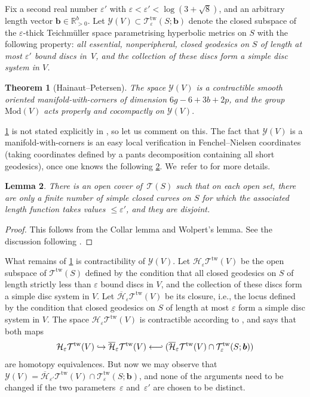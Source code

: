 \documentclass[11pt]{article}
\newcommand{\ie}{i.e.,\xspace}
\newcommand\hto{\mathrel{\lhook\joinrel\to}}
\newcommand\from{\mathchoice{\longleftarrow}{\leftarrow}{\leftarrow}{\leftarrow}}
\newcommand\hfrom{\mathrel{\from\joinrel\rhook}}
\newcommand{\bb}{\boldsymbol{b}}
\theoremstyle{plain}
\newtheorem{thm}{Theorem}[section]
\newtheorem{lem}[thm]{Lemma}
\theoremstyle{definition}
\let\eps\varepsilon
\newcommand{\T}{\mathcal T}
\newcommand{\TT}{\mathcal T^{\mathrm{tw}}}
\newcommand{\Y}{\mathcal Y}
\newcommand{\hmod}{\mathrm{Mod}}
\begin{document}
Fix a second real number $\eps'$ with $\eps<\eps'<\log(3+\sqrt 8)$, and an arbitrary length vector $\bb \in \mathbb R^b_{>0}$. Let $\Y(V) \subset \TT_\eps(S;\bb)$ denote the closed subspace of the $\eps$-thick Teichmüller space parametrising hyperbolic metrics on $S$ with the following property:
\emph{all essential, nonperipheral, closed geodesics on $S$ of length at most $\eps'$ bound discs in~$V$, and the collection of these discs form a simple disc system in $V$.}

\begin{thm}[Hainaut--Petersen]\label{hp}
The space $\Y(V)$ is a contractible smooth oriented manifold-with-corners of dimension $6g-6+3b+2p$, and the group $\hmod(V)$ acts properly and cocompactly on $\Y(V).$
\end{thm}

\cref{hp} is not stated explicitly in \cite{hainautpetersen}, so let us comment on this. The fact that $\Y(V)$ is a manifold-with-corners is an easy local verification in Fenchel--Nielsen coordinates (taking coordinates defined by a pants decomposition containing all short geodesics), once one knows the following \cref{lemma:wolpert}. We~refer to \cite[\S 2]{hainautpetersen} for more details.

\begin{lem}\label{lemma:wolpert}
There is an open cover of $\,\T(S)$ such that on each open set, there are only a finite number of simple closed curves on $S$ for which the associated length function takes values $\leq \eps'$, and they are disjoint.
\end{lem}

\begin{proof}This follows from the Collar lemma and Wolpert's lemma. See the discussion following \cite[Th.\,2.3]{hainautpetersen}.
\end{proof}
What remains of \cref{hp} is contractibility of $\Y(V)$. Let $\mathcal{H}_\eps\TT(V)$ be the open subspace of $\TT(S)$ defined by the condition that all closed geodesics on $S$ of length strictly less than $\eps$ bound discs in $V$, and the collection of these discs form a simple disc system in $V$. Let $\overline{\mathcal{H}}_\eps\TT(V)$ be its closure, \ie the locus defined by the condition that closed geodesics on $S$ of length at most $\eps$ form a simple disc system in $V$. The space $\mathcal{H}_\eps\TT(V)$ is contractible according to \cite[Th.\,1.4]{hainautpetersen}, and \cite[Prop.\,3.5]{hainautpetersen} says that both maps\vspace*{-3pt}\enlargethispage{.5\baselineskip}
\[
\mathcal{H}_\eps\TT(V) \hto \overline{\mathcal{H}}_\eps\TT(V) \hfrom (\overline{\mathcal{H}}_\eps\TT(V) \cap \TT_\eps(S;\bb))
\]
are homotopy equivalences. But now we may observe that $\Y(V) = \overline{\mathcal{H}}_{\eps'}\TT(V) \cap \TT_\eps(S;\bb)$, and none of the arguments need to be changed if the two parameters~$\eps$ and~$\eps'$ are chosen to be distinct.
\end{document}
